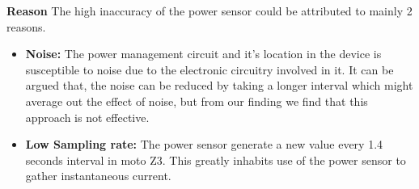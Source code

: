 {\bf Reason }
The high inaccuracy of the power sensor could be attributed to mainly 2 reasons.
\begin{itemize}
    \item {\bf Noise: } The power management circuit and it's location in the device is susceptible to noise due to the electronic circuitry involved in it.
    It can be argued that, the noise can be reduced by taking a longer interval which might average out the effect of noise, but from our finding we find that this approach is not effective.
    
    \item {\bf Low Sampling rate: } The power sensor generate a new value every 1.4 seconds interval in moto Z3.
    This greatly inhabits use of the power sensor to gather instantaneous current. 
 \end{itemize}
\fi


